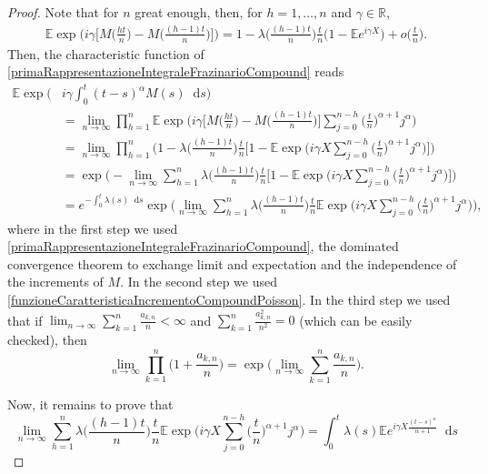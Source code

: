 \documentclass[12pt, twoside, english, headsepline]{article}
\newcommand*\dif{\mathop{}\!\mathrm{d}}  %
\theoremstyle{definition} %
\numberwithin{equation}{section} %
\begin{document}
\begin{proof}
Note that for $n$ great enough, then, for $ h=1,\dots,n$ and $\gamma \in\mathbb{R}$,
\begin{align}\label{funzioneCaratteristicaIncrementoCompoundPoisson}
	\mathbb{E} \exp\Bigg(i\gamma \bigg[ M\bigg(\frac{ht}{n}\bigg) - M\bigg(\frac{(h-1)t}{n}\bigg)\bigg] \Bigg) =1-\lambda\bigg(\frac{(h-1)t}{n}\bigg)\frac{t}{n}\Bigg(1-\mathbb{E}e^{i\gamma X}\Bigg)+o\bigg(\frac{t}{n}\bigg).
\end{align}
Then, the characteristic function of \eqref{primaRappresentazioneIntegraleFrazinarioCompound} reads
\begin{align}
	\mathbb{E}\exp\bigg(&i\gamma \int_0^t (t-s)^\alpha M(s)\dif s\bigg)\nonumber \\
	&= \lim_{n\rightarrow\infty}\prod_{h=1}^n\mathbb{E} \exp\Bigg(i\gamma \bigg[M\bigg(\frac{ht}{n}\bigg) - M\bigg(\frac{(h-1)t}{n}\bigg) \bigg] \sum_{j = 0}^{n-h} \bigg(\frac{t}{n}\bigg)^{\alpha+1} j^\alpha \Bigg)\nonumber\\
	& = \lim_{n\rightarrow\infty}\prod_{h=1}^n \Bigg( 1-\lambda\bigg(\frac{(h-1)t}{n}\bigg)\frac{t}{n}\bigg[1-\mathbb{E}\exp\bigg( i\gamma X \sum_{j = 0}^{n-h} \bigg(\frac{t}{n}\bigg)^{\alpha+1} j^\alpha \bigg)\bigg] \Bigg)\nonumber\\
	& = \exp\Bigg( -\lim_{n\rightarrow\infty} \sum_{h=1}^n\lambda\bigg(\frac{(h-1)t}{n}\bigg)\frac{t}{n}\bigg[1-\mathbb{E}\exp\bigg( i\gamma X \sum_{j = 0}^{n-h} \bigg(\frac{t}{n}\bigg)^{\alpha+1} j^\alpha \bigg)\bigg] \Bigg) \nonumber\\ %
	& = e^{-\int_0^t \lambda(s)\dif s} \exp\Bigg(\lim_{n\rightarrow\infty} \sum_{h=1}^n \lambda\bigg(\frac{(h-1)t}{n}\bigg)\frac{t}{n} \mathbb{E}\exp\bigg( i\gamma X \sum_{j = 0}^{n-h} \bigg(\frac{t}{n}\bigg)^{\alpha+1} j^\alpha \bigg) \Bigg) ,\nonumber
\end{align}
where in the first step we used \eqref{primaRappresentazioneIntegraleFrazinarioCompound}, the dominated convergence theorem to exchange limit and expectation and the independence of the increments of $M$.  In the second step we used \eqref{funzioneCaratteristicaIncrementoCompoundPoisson}. In the third step we used that if $\lim_{n\rightarrow\infty} \sum_{k=1}^n \frac{a_{k,n}}{n}<\infty$ and $\sum_{k=1}^n \frac{a^2_{k,n}}{n^2}=0$ (which can be easily checked), then
$$\lim_{n\rightarrow\infty} \prod_{k=1}^n\Big(1+\frac{a_{k,n}}{n}\Big) = \exp\Bigg( \lim_{n\rightarrow\infty}\sum_{k=1}^n \frac{a_{k,n}}{n}\Bigg).$$

Now, it remains to prove that
\begin{equation}
	\lim_{n\rightarrow\infty} \sum_{h=1}^n \lambda\bigg(\frac{(h-1)t}{n}\bigg)\frac{t}{n} \mathbb{E}\exp\bigg( i\gamma X \sum_{j = 0}^{n-h} \bigg(\frac{t}{n}\bigg)^{\alpha+1} j^\alpha \bigg) = \int_0^t \lambda(s) \mathbb{E} e^{i\gamma X \frac{(t-s)^\alpha}{ \alpha+1}  } \dif s
	\end{equation}


\end{proof}
\end{document}
